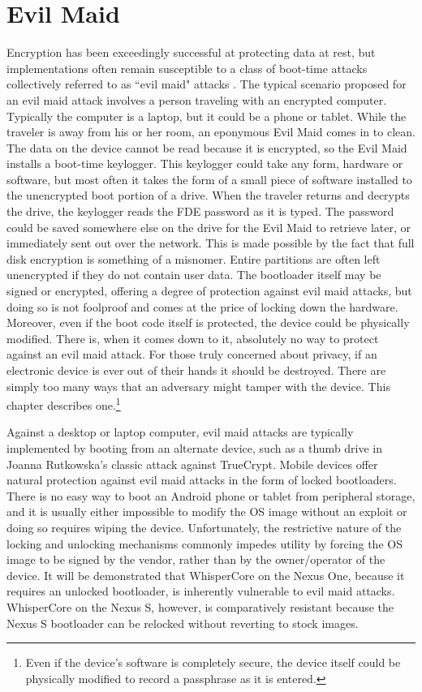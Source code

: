 \section{Evil Maid}
Encryption has been exceedingly successful at protecting data at rest, but implementations often remain susceptible to a class of
boot-time attacks collectively referred to as ``evil maid" attacks \cite{schneiermaid}. The typical scenario proposed for an evil
maid attack involves a person traveling with an encrypted computer. Typically the computer is a laptop, but it could be a phone or
tablet.  While the traveler is away from his or her room, an eponymous Evil Maid comes in to clean. The data on the device cannot be
read because it is encrypted, so the Evil Maid installs a boot-time keylogger. This keylogger could take any form, hardware or
software, but most often it takes the form of a small piece of software installed to the unencrypted boot portion of a drive. When
the traveler returns and decrypts the drive, the keylogger reads the FDE password as it is typed. The password could be saved
somewhere else on the drive for the Evil Maid to retrieve later, or immediately sent out over the network.  This is made possible by
the fact that full disk encryption is something of a misnomer.  Entire partitions are often left unencrypted if they do not contain
user data.  The bootloader itself may be signed or encrypted, offering a degree of protection against evil maid attacks, but doing
so is not foolproof \cite{attackingbitlocker} and comes at the price of locking down the hardware. Moreover, even if the boot code
itself is protected, the device could be physically modified. There is, when it comes down to it, absolutely no way to protect
against an evil maid attack.  For those truly concerned about privacy, if an electronic device is ever out of their hands it should
be destroyed. There are simply too many ways that an adversary might tamper with the device. This chapter describes
one.\footnote{Even if the device's software is completely secure, the device itself could be physically modified to record a
passphrase as it is entered.}

Against a desktop or laptop computer, evil maid attacks are typically implemented by booting from an alternate device, such as a
thumb drive in Joanna Rutkowska's \citeyear{evilmaid} classic attack against TrueCrypt.  Mobile devices offer natural protection against evil
maid attacks in the form of locked bootloaders.  There is no easy way to boot an Android phone or tablet from peripheral storage,
and it is usually either impossible to modify the OS image without an exploit or doing so requires wiping the device.
Unfortunately, the restrictive nature of the locking and unlocking mechanisms commonly impedes utility by forcing the OS image to be
signed by the vendor, rather than by the owner/operator of the device. It will be demonstrated that WhisperCore on the Nexus One,
because it requires an unlocked bootloader, is inherently vulnerable to evil maid attacks.  WhisperCore on the Nexus S, however, is
comparatively resistant because the Nexus S bootloader can be relocked without reverting to stock images.  

